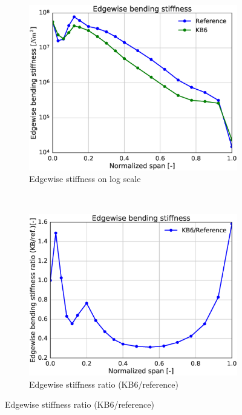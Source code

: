 \begin{figure}[tph]
\begin{subfigure}{0.50\textwidth}
\includegraphics[width=\linewidth]{figures/KB6_final/KB6_edgeStiff_log.eps}
\caption{Edgewise stiffness on log scale}
\label{subfig:KB6_edgestiff_log}
\end{subfigure}
 ~
\begin{subfigure}{0.50\textwidth}
\includegraphics[width=\linewidth]{figures/KB6_final/KB6_edgeStiff_ratio.eps}
\caption{Edgewise stiffness ratio (KB6/reference)}
\label{subfig:KB6_edgestiff_ratio}
\end{subfigure}


\end{figure}

